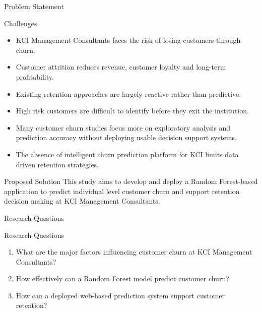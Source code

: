 \documentclass[10pt]{beamer}
\begin{document}
	
\begin{frame}{Problem Statement}
	
	\small
	
	\begin{alertblock}{Challenges}
		\begin{itemize}
			\item KCI Management Consultants faces the risk of losing customers through churn.
			
			\item Customer attrition reduces revenue, customer loyalty and long-term profitability.
			
			\item Existing retention approaches are largely reactive rather than predictive.
			
			\item High risk customers are difficult to identify before they exit the institution.
			
			\item Many customer churn studies focus more on exploratory analysis and prediction accuracy without deploying usable decision support systems.
			
			\item The absence of intelligent churn prediction platform for KCI limits data driven retention strategies.
		\end{itemize}
	\end{alertblock}
	
	\vspace{0.2cm}
	
	\begin{exampleblock}{Proposed Solution}
		This study aims to develop and deploy a Random Forest-based application to predict individual level customer churn and support retention decision making at KCI Management Consultants.
	\end{exampleblock}
	
\end{frame}


\begin{frame}{Research Questions}
	
	\small
	
	\begin{exampleblock}{Research Questions}
		\begin{enumerate}
			\item What are the major factors influencing customer churn at KCI Management Consultants?
			
			\item How effectively can a Random Forest model predict customer churn?
			
			\item How can a deployed web-based prediction system support customer retention?
		\end{enumerate}
	\end{exampleblock}
	
\end{frame}
	
\end{document}

